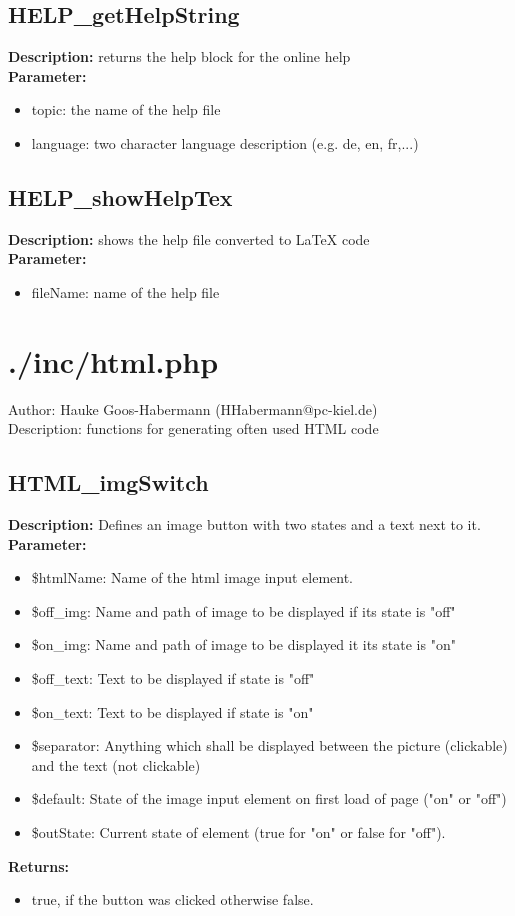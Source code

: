 \subsection{HELP\_getHelpString}
\textbf{Description:} returns the help block for the online help\\
\textbf{Parameter:}
\begin{itemize}
\item topic: the name of the help file
\item language: two character language description (e.g. de, en, fr,...)
\end{itemize}

\subsection{HELP\_showHelpTex}
\textbf{Description:} shows the help file converted to LaTeX code\\
\textbf{Parameter:}
\begin{itemize}
\item fileName: name of the help file
\end{itemize}

\newpage\section{./inc/html.php}
 Author: Hauke Goos-Habermann (HHabermann@pc-kiel.de)\\
 Description: functions for generating often used HTML code\\

\subsection{HTML\_imgSwitch}
\textbf{Description:} Defines an image button with two states and a text next to it.\\
\textbf{Parameter:}
\begin{itemize}
\item \$htmlName: Name of the html image input element.
\item \$off\_img: Name and path of image to be displayed if its state is "off"
\item \$on\_img: Name and path of image to be displayed it its state is "on"
\item \$off\_text: Text to be displayed if state is "off"
\item \$on\_text: Text to be displayed if state is "on"
\item \$separator: Anything which shall be displayed between the picture (clickable) and the text (not clickable)
\item \$default: State of the image input element on first load of page ("on" or "off")
\item \$outState: Current state of element (true for "on" or false for "off").
\end{itemize}
\textbf{Returns:}
\begin{itemize}
\item true, if the button was clicked otherwise false.
\end{itemize}


